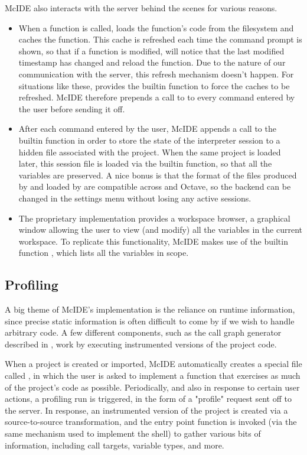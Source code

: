 McIDE also interacts with the \matlab server behind the scenes for various
reasons.

\begin{itemize}

\item When a function is called, \matlab loads the function's code from the
filesystem and caches the function. This cache is refreshed each time the
command prompt is shown, so that if a function is modified, \matlab will notice
that the last modified timestamp has changed and reload the function. Due to
the nature of our communication with the \matlab server, this refresh mechanism
doesn't happen. For situations like these, \matlab provides the 
builtin function to force the caches to be refreshed. McIDE therefore prepends
a call to  to every command entered by the user before sending it
off.

\item After each command entered by the user, McIDE appends a call to the
 \matlab builtin function in order to store the state of the
interpreter session to a hidden file associated with the project. When the same
project is loaded later, this session file is loaded via the builtin
 function, so that all the variables are preserved. A nice bonus is
that the format of the files produced by  and loaded by 
are compatible across \matlab and Octave, so the backend can be changed in the
settings menu without losing any active sessions.

\item The proprietary \matlab implementation provides a workspace browser, a
graphical window allowing the user to view (and modify) all the variables in
the current workspace. To replicate this functionality, McIDE makes use of the
\matlab builtin function , which lists all the variables in scope.

\end{itemize}

\subsection{Profiling}

A big theme of McIDE's implementation is the reliance on runtime information,
since precise static information is often difficult to come by if we wish to
handle arbitrary \matlab code. A few different components, such as the call
graph generator described in , work
by executing instrumented versions of the project code.

When a project is created or imported, McIDE automatically creates a special
file called , in which the user is asked to implement
a function that exercises as much of the project's code as possible.
Periodically, and also in response to certain user actions, a profiling run is
triggered, in the form of a "profile" request sent off to the server. In
response, an instrumented version of the project is created via a
source-to-source transformation, and the entry point function is invoked (via
the same mechanism used to implement the \matlab shell) to gather various bits
of information, including call targets, variable types, and more.
